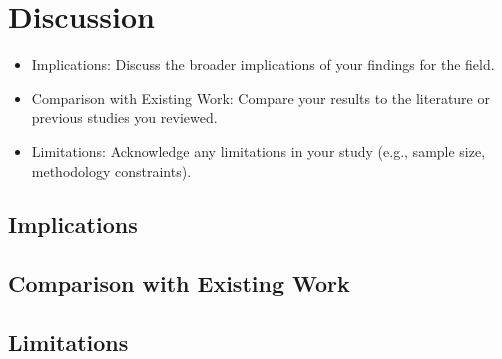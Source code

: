 
\section{Discussion}

\begin{itemize}
    \item Implications: Discuss the broader implications of your findings for the field.
    \item Comparison with Existing Work: Compare your results to the literature or previous studies you reviewed.
    \item Limitations: Acknowledge any limitations in your study (e.g., sample size, methodology constraints).
\end{itemize}








\subsection{Implications}



\subsection{Comparison with Existing Work}




\subsection{Limitations}


